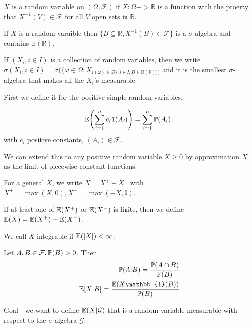 \begin{defn}
  \label{defn:5}
  $X$ is a random variable on $(\Omega, \mathcal{F})$  if $X: \Omega
  -> \mathbb{R}$ is a function with the proerty that $X^{-1}(V) \in
  \mathcal{F}$ for all $V$ open sets in $\mathbb{R}$.
\end{defn}

\begin{exer}
  If $X$ is a random varaible then $\{ B \subseteq \mathbb{R}, X^{-1}(B)
  \in \mathcal{F} \}$ is a $\sigma$-algebra and contains
  $\mathbb{B}(\mathbb{R})$.
\end{exer}

If $(X_{i}, i \in I)$ is a collection of random variables, then we
write $\sigma(X_{i}, i \in I) = \sigma(\{ \omega \in \Omega:
X_{i(\omega) \in \mathcal{B} \}, i \in I, B \in
  \mathbb{B}(\mathbb{R}))) }$
and it is the smallest $\sigma$-algebra that makes all the $X_{i}$'s
measurable.

\begin{defn}
  \label{defn:6}
  First we define it for the positive simple random variables.

  \begin{equation}
    \label{eq:2}
    \E{\sum_{i=1}^{n} c_{i} \mathbf{1}(A_{i})} =
    \sum_{i=1}^{n} \Prob{A_{i}}.
  \end{equation}
  with $c_{i}$ positive constants, $(A_{i}) \in \mathcal{F}$.

  We can extend this to any positive random variable $X \geq 0$ by
  approximation $X$ as the limit of piecewise constant functions.

  For a general $X$, we write $X = X^{+} - X^{-}$ with $X^{+}= \max(X,
  0), X^{-} = \max(-X, 0)$.
\end{defn}

If at least one of $\E{X^{+}}$ or $\E{X^{-}}$ is
finite, then we define $\E{X} = \E{X^{+}} +
\E{X^{-}}$.

We call $X$ integrable if $\E{|X|} < \infty$.

\begin{defn}
  \label{defn:7}
  Let $A, B \in \mathcal{F}, \Prob{B} > 0$. Then
  \begin{align*}
    \Prob{A | B} = \frac{\Prob{A \cap B}}{\Prob{B}} \\
    \mathbb{E}[X | B] = \frac{\E{X \mathbb{1}(B)}}{\Prob{B}}
  \end{align*}
\end{defn}

Goal - we want to define $\E{X | \mathcal{G}}$ that is a
random variable measurable with respect to the $\sigma$-algebra
$\mathcal{G}$.

